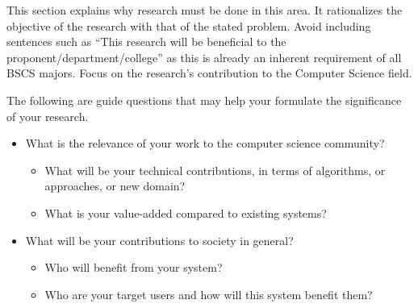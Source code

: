 This section explains why research must be done in this area.
 It rationalizes the objective of the research with that of the stated problem. 
 Avoid including sentences such as ``This research will be beneficial to the proponent/department/college'' as this is already an inherent requirement of all BSCS majors.  Focus on the research's contribution to the Computer Science field.

The following are guide questions that may help your formulate the significance of your research. 


%
%
\begin{itemize}
\item  What is the relevance of your work to the computer science community? 

\begin{itemize} 
\item What will be your technical contributions, in terms of algorithms, or approaches, or new domain? 
\item What is your value-added compared to existing systems? 
\end{itemize}

\item What will be your contributions to society in general? 
    \begin{itemize}
      \item Who will benefit from your system? 
      \item Who are your target users and how will this system benefit them? 
   \end{itemize}
\end{itemize}

\begin{comment}
If applicable, describe possible commercialization and/or innovation in your research.
\end{comment}


